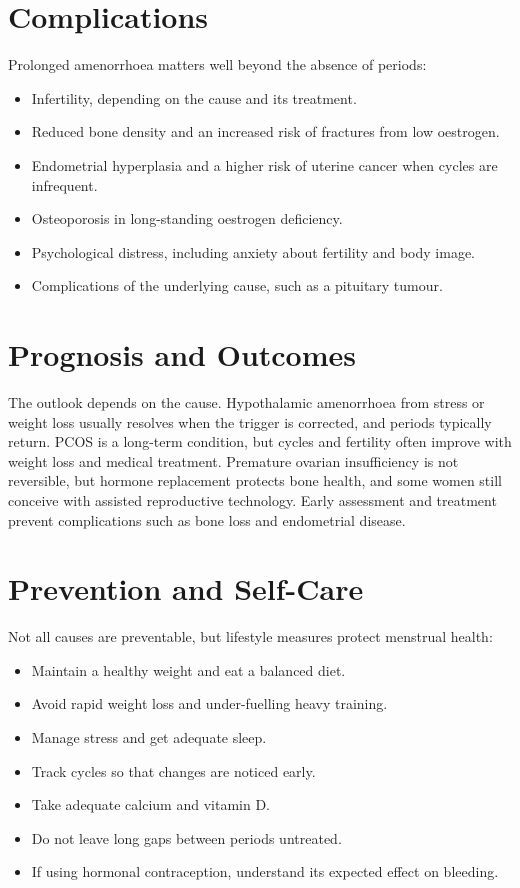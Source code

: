 \section*{Complications}
Prolonged amenorrhoea matters well beyond the absence of periods:

\begin{itemize}
    \item Infertility, depending on the cause and its treatment.
    \item Reduced bone density and an increased risk of fractures from low oestrogen.
    \item Endometrial hyperplasia and a higher risk of uterine cancer when cycles are infrequent.
    \item Osteoporosis in long-standing oestrogen deficiency.
    \item Psychological distress, including anxiety about fertility and body image.
    \item Complications of the underlying cause, such as a pituitary tumour.
\end{itemize}

\section*{Prognosis and Outcomes}
The outlook depends on the cause. Hypothalamic amenorrhoea from stress or weight loss usually resolves when the trigger is corrected, and periods typically return. PCOS is a long-term condition, but cycles and fertility often improve with weight loss and medical treatment. Premature ovarian insufficiency is not reversible, but hormone replacement protects bone health, and some women still conceive with assisted reproductive technology. Early assessment and treatment prevent complications such as bone loss and endometrial disease.

\section*{Prevention and Self-Care}
Not all causes are preventable, but lifestyle measures protect menstrual health:

\begin{itemize}
    \item Maintain a healthy weight and eat a balanced diet.
    \item Avoid rapid weight loss and under-fuelling heavy training.
    \item Manage stress and get adequate sleep.
    \item Track cycles so that changes are noticed early.
    \item Take adequate calcium and vitamin D.
    \item Do not leave long gaps between periods untreated.
    \item If using hormonal contraception, understand its expected effect on bleeding.
\end{itemize}

